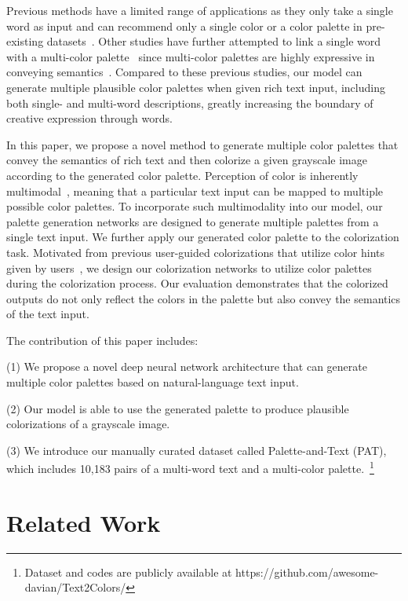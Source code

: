 \documentclass[runningheads]{llncs}
\begin{document}
Previous methods have a limited range of applications as they only take a single word as input and can recommend only a single color or a color palette in pre-existing datasets~\cite{heer2012color,chuang2008probabilistic,kawakami2016character,monroe2017colors}. Other studies have further attempted to link a single word with a multi-color palette~\cite{liu2014autostyle,solli2010color} since multi-color palettes are highly expressive in conveying semantics~\cite{kobayashi2009color}. Compared to these previous studies, our model can generate multiple plausible color palettes when given rich text input, including both single- and multi-word descriptions, greatly increasing the boundary of creative expression through words.


In this paper, we propose a novel method to generate multiple color palettes that convey the semantics of rich text and then colorize a given grayscale image according to the generated color palette. Perception of color is inherently multimodal~\cite{charpiat2008automatic}, meaning that a particular text input can be mapped to multiple possible color palettes. To incorporate such multimodality into our model, our palette generation networks are designed to generate multiple palettes from a single text input. We further apply our generated color palette to the colorization task. Motivated from previous user-guided colorizations that utilize color hints given by users~\cite{xiao2018interactive,zhang2017real}, we design our colorization networks to utilize color palettes during the colorization process. Our evaluation demonstrates that the colorized outputs do not only reflect the colors in the palette but also convey the semantics of the text input.

The contribution of this paper includes: 
 
\noindent (1) We propose a novel deep neural network architecture that can generate multiple color palettes based on natural-language text input. 

\noindent (2) Our model is able to use the generated palette to produce plausible colorizations of a grayscale image. 

\noindent (3) We introduce our manually curated dataset called Palette-and-Text (PAT), which includes 10,183 pairs of a multi-word text and a multi-color palette.~\footnote{Dataset and codes are publicly available at https://github.com/awesome-davian/Text2Colors/}

\section{Related Work}
\end{document}
